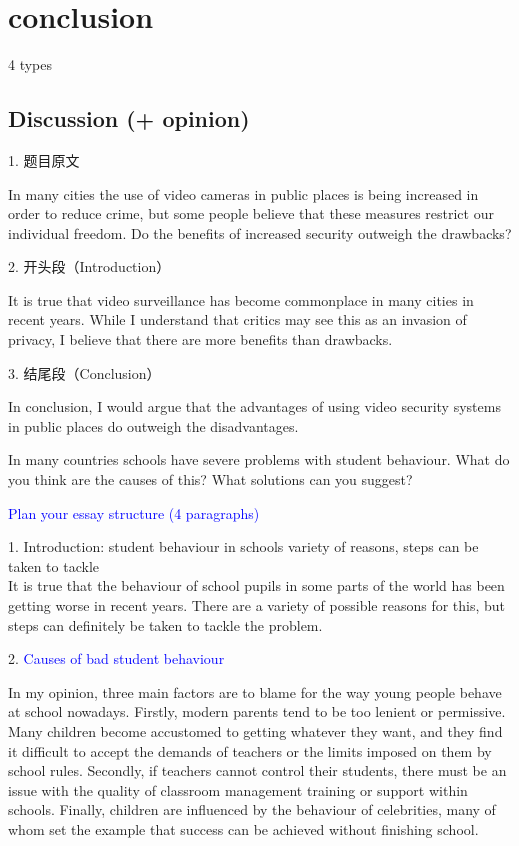 \documentclass[12pt,a4paper]{article}
\newcommand{\textblue}[1]{\textcolor{blue}{#1}}  %
\begin{document}
\section{conclusion}

4 types

\subsection{Discussion (+ opinion)}

1. 题目原文

In many cities the use of video cameras in public places is being increased in order to reduce crime, but some people believe that these measures restrict our individual freedom.
Do the benefits of increased security outweigh the drawbacks?

2. 开头段（Introduction）

It is true that video surveillance has become commonplace in many cities in recent years. While I understand that critics may see this as an invasion of privacy, I believe that there are more benefits than drawbacks.

3. 结尾段（Conclusion）

In conclusion, I would argue that the advantages of using video security systems in public places do outweigh the disadvantages.



\newpage
In many countries schools have severe problems with student behaviour.  
What do you think are the causes of this?  
What solutions can you suggest?  

\textblue{Plan your essay structure (4 paragraphs)  }

1. Introduction: student behaviour in schools variety of reasons, steps can be taken to tackle\\[-3pt]  
It is true that the behaviour of school pupils in some parts of the world has been getting worse in recent years. 
There are a variety of possible reasons for this, but steps can definitely be taken to tackle the problem.

2. \textblue{Causes of bad student behaviour}

In my opinion, three main factors are to blame for the way young people behave at school nowadays. Firstly, modern parents tend to be too lenient or permissive. 
Many children become accustomed to getting whatever they want, and they find it difficult to accept the demands of teachers or the limits imposed on them by school rules. 
Secondly, if teachers cannot control their students, there must be an issue with the quality of classroom management training or support within schools. 
Finally, children are influenced by the behaviour of celebrities, many of whom set the example that success can be achieved without finishing school.
\end{document}
